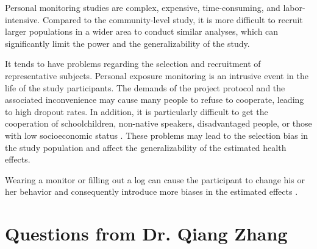 \documentclass[11pt]{article}
\begin{document}
\begin{itemize*}
{\begin{enumerate*}[{[(1)]}]
            \item Personal monitoring studies are complex, expensive, time-consuming, and labor-intensive. Compared to the community-level study, it is more difficult to recruit larger populations in a wider area to conduct similar analyses, which can significantly limit the power and the generalizability of the study. 
            \item It tends to have problems regarding the selection and recruitment of representative subjects. Personal exposure monitoring is an intrusive event in the life of the study participants. The demands of the project protocol and the associated inconvenience may cause many people to refuse to cooperate, leading to high dropout rates. In addition, it is particularly difficult to get the cooperation of schoolchildren, non-native speakers, disadvantaged people, or those with low socioeconomic status \citep{watson1988air}. These problems may lead to the selection bias in the study population and affect the generalizability of the estimated health effects. 
            \item Wearing a monitor or filling out a log can cause the participant to change his or her behavior and consequently introduce more biases in the estimated effects \citep{ryan1986estimating}.
        \end{enumerate*}
    }
\end{itemize*}



\hdashrule{\textwidth}{0.1pt}{0.6mm 0.6mm}
\setcounter{section}{0}

\section*{Questions from Dr. Qiang Zhang}
\end{document}
